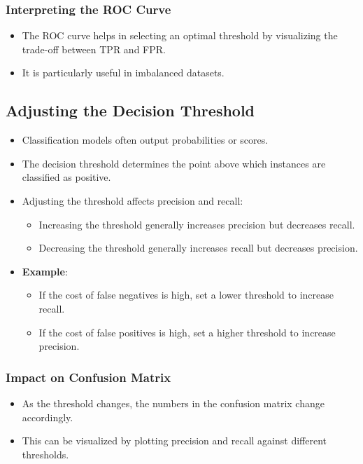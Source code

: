 \documentclass{article}
\begin{document}
\subsubsection{Interpreting the ROC Curve}

\begin{itemize}
    \item The ROC curve helps in selecting an optimal threshold by visualizing the trade-off between TPR and FPR.
    \item It is particularly useful in imbalanced datasets.
\end{itemize}

\subsection{Adjusting the Decision Threshold}

\begin{itemize}
    \item Classification models often output probabilities or scores.
    \item The decision threshold determines the point above which instances are classified as positive.
    \item Adjusting the threshold affects precision and recall:
    \begin{itemize}
        \item Increasing the threshold generally increases precision but decreases recall.
        \item Decreasing the threshold generally increases recall but decreases precision.
    \end{itemize}
    \item \textbf{Example}:
    \begin{itemize}
        \item If the cost of false negatives is high, set a lower threshold to increase recall.
        \item If the cost of false positives is high, set a higher threshold to increase precision.
    \end{itemize}
\end{itemize}

\subsubsection{Impact on Confusion Matrix}

\begin{itemize}
    \item As the threshold changes, the numbers in the confusion matrix change accordingly.
    \item This can be visualized by plotting precision and recall against different thresholds.
\end{itemize}
\end{document}
